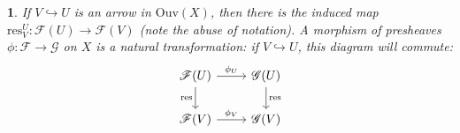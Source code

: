 \documentclass[12pt]{article}
\newtheorem{para}[theorem]{}
\begin{document}
\begin{para}
	If $V\hookrightarrow U$ is an arrow in $\text{Ouv}(X)$, then there is the induced map $\text{res}^U_V:\mathscr{F}(U)\to\mathscr{F}(V)$ (note the abuse of notation). A morphism of presheaves $\phi:\mathscr{F}\to\mathscr{G}$ on $X$ is a natural transformation: if $V\hookrightarrow U$, this diagram will commute:
	\begin{equation*}
\begin{tikzcd}
\mathscr{F}(U) \arrow[r, "\phi_U"] \arrow[d, "\text{res}"'] & \mathscr{G}(U) \arrow[d, "\text{res}"] \\
\mathscr{F}(V) \arrow[r, "\phi_V"]                          & \mathscr{G}(V)                        
\end{tikzcd}
	\end{equation*}
\end{para}
\end{document}
